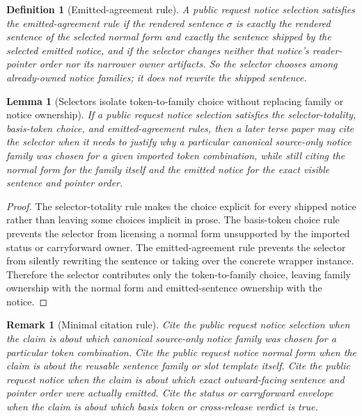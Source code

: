 \documentclass[11pt]{article}
\newtheorem{definition}{Definition}
\newtheorem{lemma}{Lemma}
\newtheorem{remark}{Remark}
\begin{document}
\begin{definition}[Emitted-agreement rule]
A public request notice selection satisfies the \emph{emitted-agreement rule} if the rendered sentence $\sigma$ is exactly the rendered sentence of the selected normal form and exactly the sentence shipped by the selected emitted notice, and if the selector changes neither that notice's reader-pointer order nor its narrower owner artifacts.
So the selector chooses among already-owned notice families; it does not rewrite the shipped sentence.
\end{definition}

\begin{lemma}[Selectors isolate token-to-family choice without replacing family or notice ownership]
If a public request notice selection satisfies the selector-totality, basis-token choice, and emitted-agreement rules, then a later terse paper may cite the selector when it needs to justify why a particular canonical source-only notice family was chosen for a given imported token combination, while still citing the normal form for the family itself and the emitted notice for the exact visible sentence and pointer order.
\end{lemma}

\begin{proof}
The selector-totality rule makes the choice explicit for every shipped notice rather than leaving some choices implicit in prose.
The basis-token choice rule prevents the selector from licensing a normal form unsupported by the imported status or carryforward owner.
The emitted-agreement rule prevents the selector from silently rewriting the sentence or taking over the concrete wrapper instance.
Therefore the selector contributes only the token-to-family choice, leaving family ownership with the normal form and emitted-sentence ownership with the notice.\qedhere
\end{proof}

\begin{remark}[Minimal citation rule]
Cite the public request notice selection when the claim is about \emph{which canonical source-only notice family was chosen for a particular token combination}.
Cite the public request notice normal form when the claim is about \emph{the reusable sentence family or slot template itself}.
Cite the public request notice when the claim is about \emph{which exact outward-facing sentence and pointer order were actually emitted}.
Cite the status or carryforward envelope when the claim is about \emph{which basis token or cross-release verdict is true}.
\end{remark}
\end{document}

